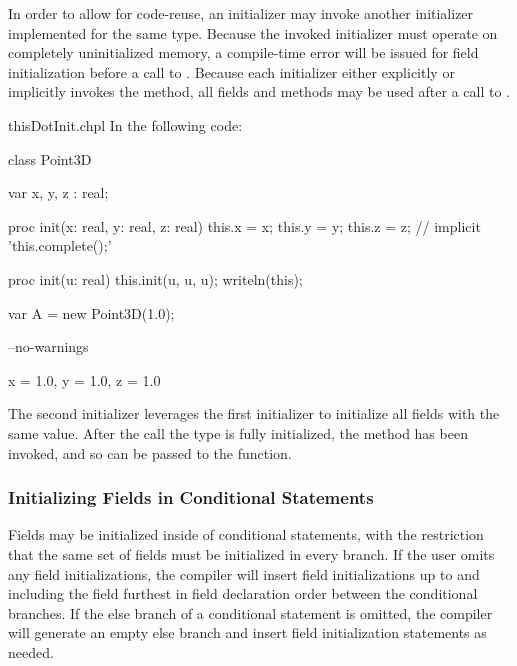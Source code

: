 In order to allow for code-reuse, an initializer may invoke another initializer
implemented for the same type. Because the invoked initializer must operate on
completely uninitialized memory, a compile-time error will be issued for field
initialization before a call to . Because each initializer
either explicitly or implicitly invokes the  method, all fields
and methods may be used after a call to .

\begin{chapelexample}{thisDotInit.chpl}
In the following code:
\begin{chapel}
class Point3D {
  var x, y, z : real;

  proc init(x: real, y: real, z: real) {
    this.x = x;
    this.y = y;
    this.z = z;
    // implicit 'this.complete();'
  }

  proc init(u: real) {
    this.init(u, u, u);
    writeln(this);
  }
}

var A = new Point3D(1.0);
\end{chapel}
\begin{chapelcompopts}
--no-warnings
\end{chapelcompopts}
\begin{chapeloutput}
{x = 1.0, y = 1.0, z = 1.0}
\end{chapeloutput}
The second initializer leverages the first initializer to initialize all fields
with the same value. After the  call the type is fully initialized,
the  method has been invoked, and so  can be passed
to the  function.
\end{chapelexample}

\subsubsection{Initializing Fields in Conditional Statements}
\label{Initializing_Fields_in_Conditional_Statements}

Fields may be initialized inside of conditional statements, with the
restriction that the same set of fields must be initialized in every branch.
If the user omits any field initializations, the compiler will insert field
initializations up to and including the field furthest in field declaration
order between the conditional branches. If the else branch of a conditional
statement is omitted, the compiler will generate an empty else branch and
insert field initialization statements as needed.

